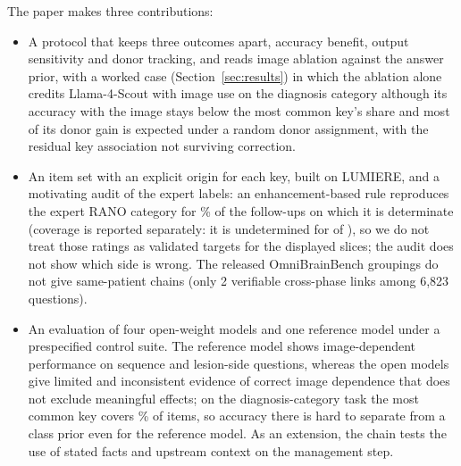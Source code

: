 \documentclass[conference]{IEEEtran}
\begin{document}
The paper makes three contributions:
\begin{itemize}[leftmargin=*, itemsep=2pt, topsep=2pt]
    \item A protocol that keeps three outcomes apart, accuracy benefit, output sensitivity and donor tracking, and reads image ablation against the answer prior, with a worked case (Section~\ref{sec:results}) in which the ablation alone credits Llama-4-Scout with image use on the diagnosis category although its accuracy with the image stays below the most common key's share and most of its donor gain is expected under a random donor assignment, with the residual key association not surviving correction.
    \item An item set with an explicit origin for each key, built on LUMIERE, and a motivating audit of the expert labels: an enhancement-based rule reproduces the expert RANO category for \vfourConcordantDetPct{}\% of the \vfourDeterminate{} follow-ups on which it is determinate (coverage is reported separately: it is undetermined for \vfourUndetermined{} of \vfourFollowups{}), so we do not treat those ratings as validated targets for the displayed slices; the audit does not show which side is wrong. The released OmniBrainBench groupings do not give same-patient chains (only 2 verifiable cross-phase links among 6,823 questions).
    \item An evaluation of four open-weight models and one reference model under a prespecified control suite. The reference model shows image-dependent performance on sequence and lesion-side questions, whereas the open models give limited and inconsistent evidence of correct image dependence that does not exclude meaningful effects; on the diagnosis-category task the most common key covers \vfourMajorityDSCR{}\% of items, so accuracy there is hard to separate from a class prior even for the reference model. As an extension, the chain tests the use of stated facts and upstream context on the management step.
\end{itemize}
\end{document}
